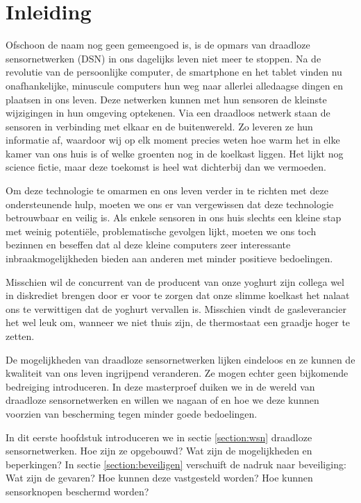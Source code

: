 
\chapter{Inleiding}
\label{inleiding}

Ofschoon de naam nog geen gemeengoed is, is de opmars van draadloze
sensornetwerken (DSN) in ons dagelijks leven niet meer te stoppen. Na de
revolutie van de persoonlijke computer, de smartphone en het tablet vinden nu
onafhankelijke, minuscule computers hun weg naar allerlei alledaagse dingen en
plaatsen in ons leven. Deze netwerken kunnen met hun sensoren de kleinste
wijzigingen in hun omgeving optekenen. Via een draadloos netwerk staan de
sensoren in verbinding met elkaar en de buitenwereld. Zo leveren ze hun
informatie af, waardoor wij op elk moment precies weten hoe warm het in elke
kamer van ons huis is of welke groenten nog in de koelkast liggen. Het lijkt
nog science fictie, maar deze toekomst is heel wat dichterbij dan we vermoeden.

Om deze technologie te omarmen en ons leven verder in te richten met deze
ondersteunende hulp, moeten we ons er van vergewissen dat deze technologie
betrouwbaar en veilig is. Als enkele sensoren in ons huis slechts een kleine
stap met weinig potenti\"ele, problematische gevolgen lijkt, moeten we ons toch
bezinnen en beseffen dat al deze kleine computers zeer interessante
inbraakmogelijkheden bieden aan anderen met minder positieve bedoelingen.

Misschien wil de concurrent van de producent van onze yoghurt zijn collega wel
in diskrediet brengen door er voor te zorgen dat onze slimme koelkast het
nalaat ons te verwittigen dat de yoghurt vervallen is. Misschien vindt de
gasleverancier het wel leuk om, wanneer we niet thuis zijn, de thermostaat een
graadje hoger te zetten.

De mogelijkheden van draadloze sensornetwerken lijken eindeloos en ze kunnen de
kwaliteit van ons leven ingrijpend veranderen. Ze mogen echter geen bijkomende
bedreiging introduceren. In deze masterproef duiken we in de wereld van
draadloze sensornetwerken en willen we nagaan of en hoe we deze kunnen voorzien
van bescherming tegen minder goede bedoelingen.

In dit eerste hoofdstuk introduceren we in sectie \ref{section:wsn} draadloze
sensornetwerken. Hoe zijn ze opgebouwd? Wat zijn de mogelijkheden en
beperkingen? In sectie \ref{section:beveiligen} verschuift de nadruk naar
beveiliging: Wat zijn de gevaren? Hoe kunnen deze vastgesteld worden? Hoe
kunnen sensorknopen beschermd worden?

